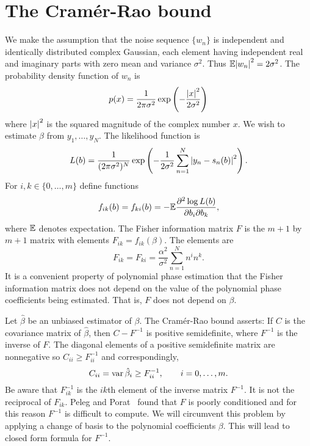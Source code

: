 \documentclass[journal,10pt]{IEEEtran}
\begin{document}
\section{The Cram\'{e}r-Rao bound} \label{sec_crb}

We make the assumption that the noise sequence $\{ w_n \}$ is independent and identically distributed complex Gaussian, each element having independent real and imaginary parts with zero mean and variance $\sigma^2$. Thus ${\mathbb E}{\left| w_n \right|}^2 = 2\sigma^2$.  The probability density function of $w_n$ is 
\[
p(x) = \frac{1}{2 \pi \sigma^2} \exp\left( -\frac{{\left| x \right|}^2}{2\sigma^2} \right)
\]
where ${\left| x \right|}^2$ is the squared magnitude of the complex number $x$.  We wish to estimate $\beta$ from $y_1, \dots, y_N$.  The likelihood function is
\[
L(b) = \frac{1}{(2 \pi \sigma^2)^N} \exp\left( - \frac{1}{2\sigma^{2}} \sum_{n=1}^N {\left| y_n -  s_n(b)  \right|}^2 \right).
\]
For $i,k \in \{0, \dots, m\}$ define functions 
\[
f_{ik}(b) = f_{ki}(b) = -{\mathbb E} \frac{ \partial^2 \log L(b) }{ \partial b_{i} \partial b_{k}},
\]  
where ${\mathbb E}$ denotes expectation.  The Fisher information matrix $F$ is the $m+1$ by $m+1$ matrix with elements $F_{i k} = f_{ik}(\beta)$.  The elements are
\[
F_{ik} = F_{ki} = \frac{\alpha^2}{\sigma^2}\sum_{n=1}^{N} n^{i}n^{k}.
\]
It is a convenient property of polynomial phase estimation that the Fisher information matrix does not depend on the value of the polynomial phase coefficients being estimated.  That is, $F$ does not depend on $\beta$.

Let $\hat{\beta}$ be an unbiased estimator of $\beta$.  The Cram\'{e}r-Rao bound asserts:  If $C$ is the covariance matrix of $\hat{\beta}$, then $C - F^{-1}$ is positive semidefinite, where $F^{-1}$ is the inverse of $F$.  The diagonal elements of a positive semidefinite matrix are nonnegative so $C_{ii} \geq F^{-1}_{ii}$ and correspondingly, 
\[
C_{ii} = \operatorname{var} \hat{\beta}_{i} \geq F_{ii}^{-1}, \qquad i=0,\dots,m.
\]  
Be aware that $F_{ik}^{-1}$ is the $ik$th element of the inverse matrix $F^{-1}$.  It is not the reciprocal of $F_{ik}$.  Peleg and Porat~\cite{Peleg1991_CRB_PPS_1991} found that $F$ is poorly conditioned and for this reason $F^{-1}$ is difficult to compute.   We will circumvent this problem by applying a change of basis to the polynomial coefficients $\beta$.  This will lead to closed form formula for $F^{-1}$.  
\end{document}
